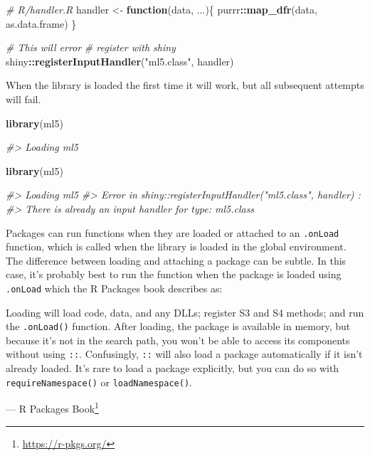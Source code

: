 \documentclass[10pt,]{krantz}
\makeatletter
\newenvironment{Shaded}{\begin{snugshade}}{\end{snugshade}}
\newcommand{\CommentTok}[1]{\textcolor[rgb]{0.37,0.37,0.37}{\textit{#1}}}
\newcommand{\ControlFlowTok}[1]{\textcolor[rgb]{0.27,0.27,0.27}{\textbf{#1}}}
\newcommand{\KeywordTok}[1]{\textcolor[rgb]{0.27,0.27,0.27}{\textbf{#1}}}
\newcommand{\NormalTok}[1]{#1}
\newcommand{\OperatorTok}[1]{\textcolor[rgb]{0.43,0.43,0.43}{\textbf{#1}}}
\newcommand{\StringTok}[1]{\textcolor[rgb]{0.5,0.5,0.5}{#1}}
\renewenvironment{quote}{\begin{VF}}{\end{VF}}
\renewcommand{\href}[2]{#2\footnote{\url{#1}}}
\newenvironment{kframe}{%
\medskip{}
\setlength{\fboxsep}{.8em}
 \def\at@end@of@kframe{}%
 \ifinner\ifhmode%
  \def\at@end@of@kframe{\end{minipage}}%
  \begin{minipage}{\columnwidth}%
 \fi\fi%
 \def\FrameCommand##1{\hskip\@totalleftmargin \hskip-\fboxsep
 \colorbox{shadecolor}{##1}\hskip-\fboxsep
     \hskip-\linewidth \hskip-\@totalleftmargin \hskip\columnwidth}%
 \MakeFramed {\advance\hsize-\width
   \@totalleftmargin\z@ \linewidth\hsize
   \@setminipage}}%
 {\par\unskip\endMakeFramed%
 \at@end@of@kframe}
\renewenvironment{Shaded}{\begin{kframe}}{\end{kframe}}
\makeatother
\begin{document}
\begin{Shaded}
\begin{Highlighting}[]
\CommentTok{# R/handler.R}
\NormalTok{handler <-}\StringTok{ }\ControlFlowTok{function}\NormalTok{(data, ...)\{}
\NormalTok{  purrr}\OperatorTok{::}\KeywordTok{map_dfr}\NormalTok{(data, as.data.frame)}
\NormalTok{\}}

\CommentTok{# This will error}
\CommentTok{# register with shiny}
\NormalTok{shiny}\OperatorTok{::}\KeywordTok{registerInputHandler}\NormalTok{(}\StringTok{"ml5.class"}\NormalTok{, handler)}
\end{Highlighting}
\end{Shaded}

When the library is loaded the first time it will work, but all subsequent attempts will fail.

\begin{Shaded}
\begin{Highlighting}[]
\KeywordTok{library}\NormalTok{(ml5)}

\CommentTok{#> Loading ml5}

\KeywordTok{library}\NormalTok{(ml5)}

\CommentTok{#> Loading ml5}
\CommentTok{#> Error in shiny::registerInputHandler("ml5.class", handler) : }
\CommentTok{#>   There is already an input handler for type: ml5.class}
\end{Highlighting}
\end{Shaded}

Packages can run functions when they are loaded or attached to an \texttt{.onLoad} function, which is called when the library is loaded in the global environment. The difference between loading and attaching a package can be subtle. In this case, it's probably best to run the function when the package is loaded using \texttt{.onLoad} which the R Packages book describes as:

\begin{quote}
Loading will load code, data, and any DLLs; register S3 and S4 methods; and run the \texttt{.onLoad()} function. After loading, the package is available in memory, but because it's not in the search path, you won't be able to access its components without using \texttt{::}. Confusingly, \texttt{::} will also load a package automatically if it isn't already loaded. It's rare to load a package explicitly, but you can do so with \texttt{requireNamespace()} or \texttt{loadNamespace()}.
\end{quote}

--- \href{https://r-pkgs.org/}{R Packages Book}
\end{document}
